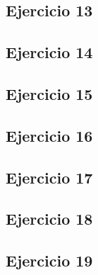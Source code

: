 \subsection{Ejercicio 13}
\subsection{Ejercicio 14}
\subsection{Ejercicio 15}
\subsection{Ejercicio 16}
\subsection{Ejercicio 17}
\subsection{Ejercicio 18}
\subsection{Ejercicio 19}
